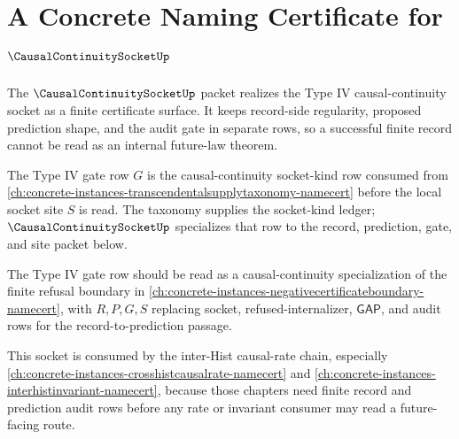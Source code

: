 \chapter{A Concrete Naming Certificate for $\CausalContinuitySocketUp$}
\label{ch:concrete-instances-causal-continuity-socket-namecert}

The $\CausalContinuitySocketUp$ packet realizes the Type IV causal-continuity socket as a finite certificate surface. It keeps record-side regularity, proposed prediction shape, and the audit gate in separate rows, so a successful finite record cannot be read as an internal future-law theorem.

The Type IV gate row $G$ is the causal-continuity socket-kind row consumed from \autoref{ch:concrete-instances-transcendentalsupplytaxonomy-namecert} before the local socket site $S$ is read. The taxonomy supplies the socket-kind ledger; $\CausalContinuitySocketUp$ specializes that row to the record, prediction, gate, and site packet below.

The Type IV gate row should be read as a causal-continuity specialization of the finite refusal boundary in \autoref{ch:concrete-instances-negativecertificateboundary-namecert}, with $R,P,G,S$ replacing socket, refused-internalizer, $\mathsf{GAP}$, and audit rows for the record-to-prediction passage.

This socket is consumed by the inter-Hist causal-rate chain, especially \autoref{ch:concrete-instances-crosshistcausalrate-namecert} and \autoref{ch:concrete-instances-interhistinvariant-namecert}, because those chapters need finite record and prediction audit rows before any rate or invariant consumer may read a future-facing route.

